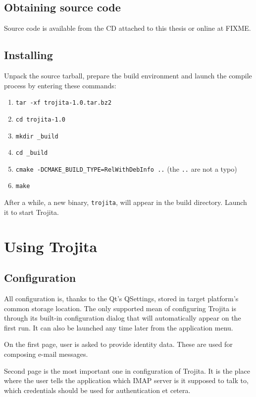 \documentclass[12pt,notitlepage]{report}
\newcommand{\trojita}{Trojita\xspace}
\begin{document}
\subsection{Obtaining source code}

Source code is available from the CD attached to this thesis or online at FIXME.

\subsection{Installing}

Unpack the source tarball, prepare the build environment and launch the compile
process by entering these commands:

\begin{enumerate}
    \item{{\tt tar -xf trojita-1.0.tar.bz2}}
    \item{{\tt cd trojita-1.0}}
    \item{{\tt mkdir \_build}}
    \item{{\tt cd \_build}}
    \item{{\tt cmake -DCMAKE\_BUILD\_TYPE=RelWithDebInfo ..}} (the {\tt ..} are
        not a typo)
    \item{{\tt make}}
\end{enumerate}

After a while, a new binary, {\tt trojita}, will appear in the build directory.
Launch it to start \trojita.

\section{Using \trojita}
\subsection{Configuration}

All configuration is, thanks to the Qt's QSettings, stored in target platform's
common storage location. The only supported mean of configuring \trojita is
through its built-in configuration dialog that will automatically appear on the
first run.  It can also be launched any time later from the application menu.


On the first page, user is asked to provide identity data. These are used for
composing e-mail messages.

Second page is the most important one in configuration of \trojita. It is the
place where the user tells the application which IMAP server is it supposed to
talk to, which credentials should be used for authentication et cetera.
\end{document}

